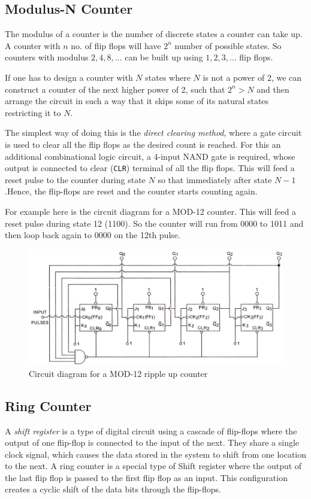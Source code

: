 \subsection{Modulus-N Counter}
The modulus of a counter is the number of discrete states a counter can take up. A
counter with $n$ no. of flip flops will have $2^n$ number of possible states. So counters with
modulus $2, 4, 8,\dots$ can be built up using $1, 2, 3, \dots$ flip flops. 

If one has to design a counter with $N$ states where $N$ is not a power of 2, we can construct a counter of the next higher power of 2, such that $2^n > N$ and then arrange the
circuit in such a way that it skips some of its natural states restricting it to $N$.

The simplest way of doing this is the \textit{direct clearing method}, where a gate circuit is used to
clear all the flip flops as the desired count is reached. For this an additional combinational logic circuit, a 4-input NAND gate is
required, whose output is connected to clear (\verb|CLR|) terminal of all the flip flops. This will feed a 
reset pulse to the counter during state $N$ so that immediately after state $N-1$.Hence, the flip-flops are reset and the counter starts counting again.

For example here is the circuit diagram for a MOD-12 counter. This will feed a reset pulse during state 12 (1100). So the counter will run from 0000 to 1011 and then loop back again to 0000 on the 12th pulse.

\begin{figure}[H]
    \centering
    \includegraphics[width=1\columnwidth]{images/mod12.png}
    \caption{Circuit diagram for a MOD-12 ripple up counter}
    \label{mod}
\end{figure}
% 
\subsection{Ring Counter}
A \textit{shift register} is a type of digital circuit using a cascade of flip-flops where the output of one flip-flop is connected to the input of the next. They share a single clock signal, which causes the data stored in the system to shift from one location to the next. A ring counter is a special type of Shift register where the output of the last flip flop is passed to the first flip flop as an input. This configuration creates a cyclic shift of the data bits through the flip-flops.

